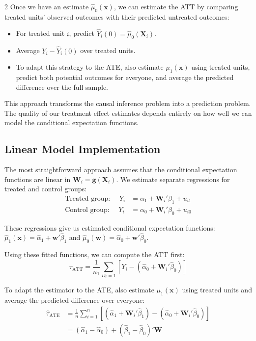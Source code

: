 \documentclass[12pt]{article}
\begin{document}
\begin{multicols}{2}
Once we have an estimate $\hat{\mu}_0(\bm{x})$, we can estimate the ATT by comparing treated units' observed outcomes with their predicted untreated outcomes:
\begin{itemize}
  \item For treated unit $i$, predict $\hat{Y}_i(0) = \hat{\mu}_0(\bm{X}_i)$.
  \item Average $Y_i - \hat{Y}_i(0)$ over treated units.
  \item To adapt this strategy to the ATE, also estimate $\mu_1(\bm{x})$ using treated units, predict both potential outcomes for everyone, and average the predicted difference over the full sample.
\end{itemize}

This approach transforms the causal inference problem into a prediction problem.
The quality of our treatment effect estimates depends entirely on how well we can model the conditional expectation functions.

\subsection*{Linear Model Implementation}

The most straightforward approach assumes that the conditional expectation functions are linear in $\bm{W}_i = \bm{g}(\bm{X}_i)$.
We estimate separate regressions for treated and control groups:
\begin{align*}
\text{Treated group: } \quad Y_i &= \alpha_1 + \bm{W}_i'\beta_1 + u_{i1} \\
\text{Control group: } \quad Y_i &= \alpha_0 + \bm{W}_i'\beta_0 + u_{i0}
\end{align*}

These regressions give us estimated conditional expectation functions:
$\hat{\mu}_1(\bm{x}) = \hat{\alpha}_1 + \bm{w}'\hat{\beta}_1$ and $\hat{\mu}_0(\bm{w}) = \hat{\alpha}_0 + \bm{w}'\hat{\beta}_0$.

Using these fitted functions, we can compute the ATT first:
$$
\hat{\tau}_{\text{ATT}} = \frac{1}{n_1} \sum_{D_i=1} [Y_i - (\hat{\alpha}_0 + \bm{W}_i'\hat{\beta}_0)]
$$

To adapt the estimator to the ATE, also estimate $\mu_1(\bm{x})$ using treated units and average the predicted difference over everyone:
\begin{align*}
\hat{\tau}_{\text{ATE}} 
&= \frac{1}{n} \sum_{i=1}^n [(\hat{\alpha}_1 + \bm{W}_i'\hat{\beta}_1) - (\hat{\alpha}_0 + \bm{W}_i'\hat{\beta}_0)] \\
&= (\hat{\alpha}_1 - \hat{\alpha}_0) + (\hat{\beta}_1 - \hat{\beta}_0)'\bar{\bm{W}}
\end{align*}


\end{multicols}
\end{document}
